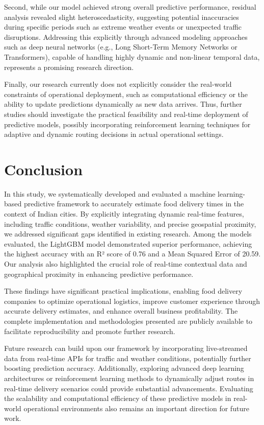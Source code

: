 \documentclass[10pt,twocolumn,letterpaper]{article}
\begin{document}
Second, while our model achieved strong overall predictive performance, residual analysis revealed slight heteroscedasticity, suggesting potential inaccuracies during specific periods such as extreme weather events or unexpected traffic disruptions. Addressing this explicitly through advanced modeling approaches such as deep neural networks (e.g., Long Short-Term Memory Networks or Transformers), capable of handling highly dynamic and non-linear temporal data, represents a promising research direction.

Finally, our research currently does not explicitly consider the real-world constraints of operational deployment, such as computational efficiency or the ability to update predictions dynamically as new data arrives. Thus, further studies should investigate the practical feasibility and real-time deployment of predictive models, possibly incorporating reinforcement learning techniques for adaptive and dynamic routing decisions in actual operational settings.


\section{Conclusion}

In this study, we systematically developed and evaluated a machine learning-based predictive framework to accurately estimate food delivery times in the context of Indian cities. By explicitly integrating dynamic real-time features, including traffic conditions, weather variability, and precise geospatial proximity, we addressed significant gaps identified in existing research. Among the models evaluated, the LightGBM model demonstrated superior performance, achieving the highest accuracy with an R² score of 0.76 and a Mean Squared Error of 20.59. Our analysis also highlighted the crucial role of real-time contextual data and geographical proximity in enhancing predictive performance.

These findings have significant practical implications, enabling food delivery companies to optimize operational logistics, improve customer experience through accurate delivery estimates, and enhance overall business profitability. The complete implementation and methodologies presented are publicly available to facilitate reproducibility and promote further research.

Future research can build upon our framework by incorporating live-streamed data from real-time APIs for traffic and weather conditions, potentially further boosting prediction accuracy. Additionally, exploring advanced deep learning architectures or reinforcement learning methods to dynamically adjust routes in real-time delivery scenarios could provide substantial advancements. Evaluating the scalability and computational efficiency of these predictive models in real-world operational environments also remains an important direction for future work.
\end{document}

